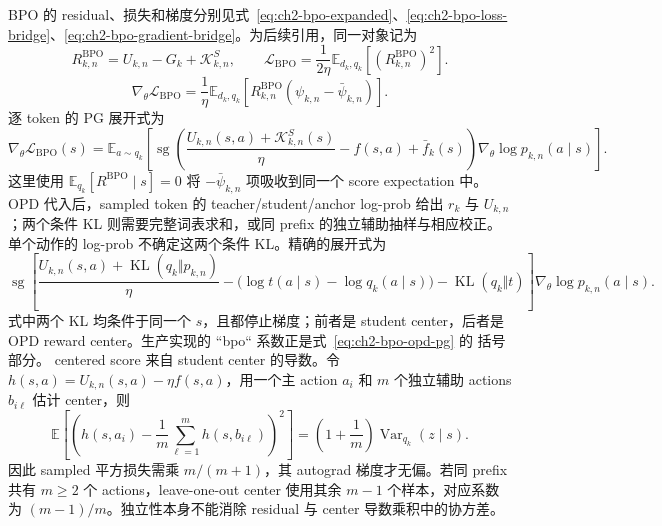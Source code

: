 \documentclass[lang=cn,scheme=chinese,openany]{../book/elegantbook}
\begin{document}
BPO 的 residual、损失和梯度分别见式~\eqref{eq:ch2-bpo-expanded}、\eqref{eq:ch2-bpo-loss-bridge}、\eqref{eq:ch2-bpo-gradient-bridge}。为后续引用，同一对象记为
\begin{equation}
R_{k,n}^{\mathrm{BPO}}=U_{k,n}-G_k+\mathcal K_{k,n}^{S},\qquad
\mathcal L_{\mathrm{BPO}}=\frac1{2\eta}\mathbb E_{d_k, q_k}[(R_{k,n}^{\mathrm{BPO}})^2].
\label{eq:ch2-bpo-residual}
\end{equation}
\begin{equation}
\nabla_\theta\mathcal L_{\mathrm{BPO}}
=\frac1\eta\mathbb E_{d_k, q_k}[R_{k,n}^{\mathrm{BPO}}(\psi_{k,n}-\bar\psi_{k,n})].
\label{eq:ch2-bpo-gradient}
\end{equation}
逐 token 的 PG 展开式为
\begin{equation}
\label{eq:ch2-bpo-pg}
\nabla_\theta\mathcal L_{\mathrm{BPO}}(s)
=\mathbb E_{a\sim q_k}\left[
\operatorname{sg}\!\left(\frac{U_{k,n}(s,a)+\mathcal K_{k,n}^{S}(s)}\eta-f(s,a)+\bar f_k(s)\right)
\nabla_\theta\log p_{k,n}(a\mid s)\right].
\end{equation}
这里使用 $\mathbb E_{ q_k}[R^{\mathrm{BPO}}\mid s]=0$ 将
$-\bar\psi_{k,n}$ 项吸收到同一个 score expectation 中。OPD 代入后，sampled token 的 teacher/student/anchor log-prob 给出 $r_k$ 与 $U_{k,n}$；两个条件 KL 则需要完整词表求和，或同 prefix 的独立辅助抽样与相应校正。单个动作的 log-prob 不确定这两个条件 KL。精确的展开式为
\begin{equation}
\label{eq:ch2-bpo-opd-pg}
\operatorname{sg}\!\left[
\frac{U_{k,n}(s,a)+\operatorname{KL}( q_k\Vert p_{k,n})}{\eta}
-\bigl(\log t(a\mid s)-\log q_k(a\mid s)\bigr)
-\operatorname{KL}( q_k\Vert t)
\right]\nabla_\theta\log p_{k,n}(a\mid s).
\end{equation}
式中两个 KL 均条件于同一个 $s$，且都停止梯度；前者是 student center，后者是
OPD reward center。生产实现的 ``bpo`` 系数正是式~\eqref{eq:ch2-bpo-opd-pg} 的
括号部分。
centered score 来自 student center 的导数。令 $h(s,a)=U_{k,n}(s,a)-\eta f(s,a)$，用一个主 action $a_i$ 和 $m$ 个独立辅助 actions $b_{i\ell}$ 估计 center，则
\begin{equation*}
\mathbb E\left[\left(h(s,a_i)-\frac1m\sum_{\ell=1}^m h(s,b_{i\ell})\right)^2\right]
=\left(1+\frac1m\right)\operatorname{Var}_{ q_k}(z\mid s).
\end{equation*}
因此 sampled 平方损失需乘 $m/(m+1)$，其 autograd 梯度才无偏。若同 prefix 共有 $m\ge2$ 个 actions，leave-one-out center 使用其余 $m-1$ 个样本，对应系数为 $(m-1)/m$。独立性本身不能消除 residual 与 center 导数乘积中的协方差。
\end{document}
